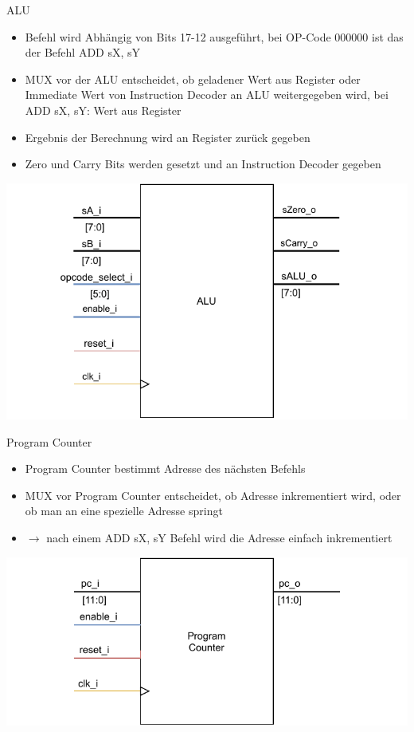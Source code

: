\documentclass[10pt, t,
aspectratio=169,%
usenames,
dvipsnames,
]{beamer}
\begin{document}
	\begin{frame}{ALU}
		\begin{multicols}{2}
		\begin{itemize}
			\item Befehl wird Abhängig von Bits 17-12 ausgeführt, bei OP-Code 000000 ist das der Befehl ADD sX, sY
			\item MUX vor der ALU entscheidet, ob geladener Wert aus Register oder Immediate Wert von Instruction Decoder an ALU weitergegeben wird, bei ADD sX, sY: Wert aus Register
			\item Ergebnis der Berechnung wird an Register zurück gegeben
			\item Zero und Carry Bits werden gesetzt und an Instruction Decoder gegeben
		\end{itemize}
		\includegraphics[width=1.2\linewidth]{../Blockbeschreibungen/ALU_beschreibung.pdf}
		\end{multicols}
	\end{frame}
	
	\begin{frame}{Program Counter}
		\begin{multicols}{2}
		\begin{itemize}
			\item Program Counter bestimmt Adresse des nächsten Befehls
			\item MUX vor Program Counter entscheidet, ob Adresse inkrementiert wird, oder ob man an eine spezielle Adresse springt
			\item $\rightarrow$ nach einem ADD sX, sY Befehl wird die Adresse einfach inkrementiert
			
		\end{itemize}
		\includegraphics[width=1.2\linewidth]{../Blockbeschreibungen/ProgramCounter_beschreibung.pdf}
		\end{multicols}
	\end{frame}
\end{document}
